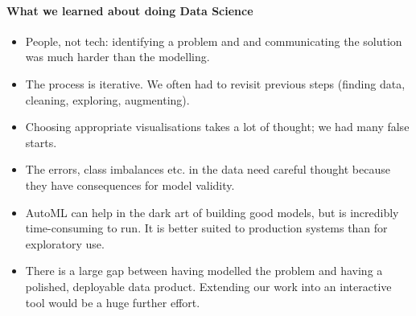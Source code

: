 \paragraph{What we learned about doing Data Science}
\vspace{-0.5em}
\begin{itemize}
    \item People, not tech: identifying a problem and 
    and communicating the solution was much harder than the modelling. \vspace{-0.25em}
    \item The process is iterative. We often had to revisit previous steps (finding data, cleaning, exploring, augmenting).\vspace{-0.25em}
    \item Choosing appropriate visualisations takes a lot of thought; we had many false starts.\vspace{-0.25em}
    \item The errors, class imbalances etc. in the data need careful thought because they have consequences for model validity.\vspace{-0.25em}
    \item AutoML can help in the dark art of building good models, but is incredibly time-consuming to run. It is better
    suited to production systems than for exploratory use.\vspace{-0.25em}
    \item There is a large gap between having modelled the problem and
    having a polished, deployable data product. Extending our work into an interactive tool would be a huge further effort.
\end{itemize}